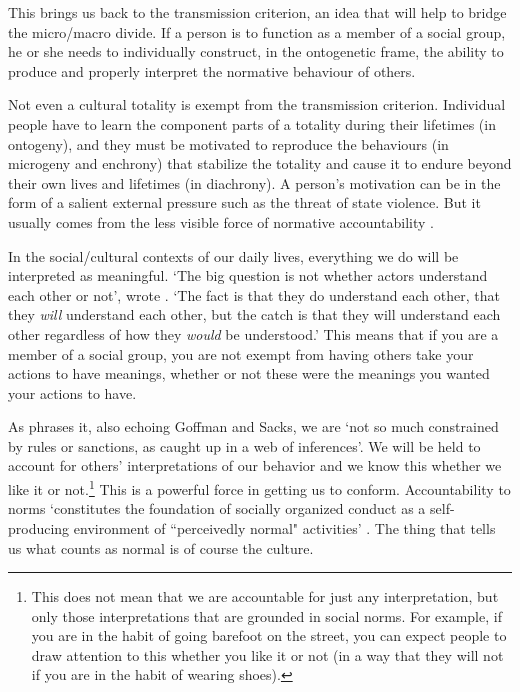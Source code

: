 This brings us back to the transmission criterion, an idea that will help to bridge the micro/macro divide. If a person is to function as a member of a social group, he or she needs to individually construct, in the ontogenetic frame, the ability to produce and properly interpret the normative behaviour of others. 



Not even a cultural totality is exempt from the transmission criterion. 
Individual people have to learn the component parts of a totality during 
their lifetimes (in ontogeny), and they must be motivated to reproduce the behaviours 
(in microgeny and enchrony) that stabilize the totality and cause it to endure beyond their own 
lives and lifetimes (in diachrony). A person's motivation can be in the form of a
salient external pressure such as the threat of state violence. But it usually comes from the less visible force of normative accountability \citep{heritage_garfinkel_1984,enfield_relationship_2013}. 



In the social/cultural contexts of our daily lives, everything we do will be interpreted as meaningful. \textquoteleft The big question is not whether 
actors understand each other or not', wrote \citet[367]{garfinkel_perception_1952}. \textquoteleft The fact is that they do understand each other, 
that they \textit{will} understand each other, but the catch is that 
they will understand each other regardless of how they \textit{would} 
be understood.' This means that if you are a member of a social group, you are not 
exempt from having others take your actions to have meanings, whether or 
not these were the meanings you wanted your actions to have. 



As \citet[321]{levinson_pragmatics_1983} phrases it, also echoing Goffman and Sacks, we 
are \textquoteleft not so much constrained by rules or sanctions, as caught up in a 
web of inferences'. We will be held to account for others' 
interpretations of our behavior and we know this whether we like it or 
not.\footnote{This does not mean that we are accountable for just any interpretation, but only those interpretations that are grounded in social norms. For example, if you are in the habit of going barefoot on the street, you can expect people to draw attention to this whether you like it or not (in a way that they will not if you are in the habit of wearing shoes).} This is a powerful force in getting us to conform. Accountability 
to norms \textquoteleft constitutes the foundation of socially organized conduct as a 
self-producing environment of \textquotedblleft perceivedly normal" activities' 
\citep[119]{heritage_garfinkel_1984}. The thing that tells us what counts as normal is of 
course the culture. 



